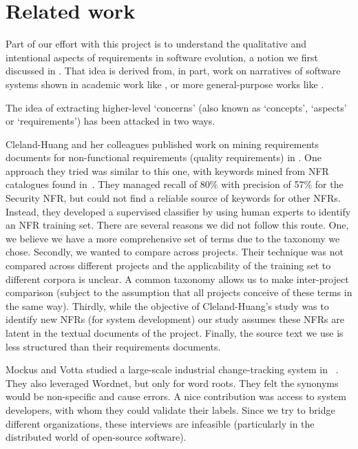 \documentclass{acm_proc_article-sp}
\begin{document}
\section{Related work}

Part of our effort with this project is to understand the qualitative and intentional aspects of requirements in software evolution, a notion we first discussed in \cite{ernst07icsm}. That idea is derived from, in part, work on narratives of software systems shown in academic work like \cite{anton01}, or more general-purpose works like \cite{waldo93}.

The idea of extracting higher-level `concerns' (also known as `concepts', `aspects' or `requirements') has been attacked in two ways.

Cleland-Huang and her colleagues published work on mining requirements documents for non-functional requirements (quality requirements) in \cite{Cleland-Huang2006}. One approach they tried was similar to this one, with keywords mined from NFR catalogues found in~\cite{chung99}. They managed recall of 80\% with precision of 57\% for the Security NFR, but could not find a reliable source of keywords for other NFRs. Instead, they developed a supervised classifier by using human experts to identify an NFR training set. There are several reasons we did not follow this route. One, we believe we have a more comprehensive set of terms due to the taxonomy we chose. Secondly, we wanted to compare across projects. Their technique was not compared across different projects and the applicability of the training set to different corpora is unclear. A common taxonomy allows us to make inter-project comparison (subject to the assumption that all projects conceive of these terms in the same way). Thirdly, while the objective of Cleland-Huang's study was to identify new NFRs (for system development) our study assumes these NFRs are latent in the textual documents of the project. Finally, the source text we use is less structured than their requirements documents.

Mockus and Votta studied a large-scale industrial change-tracking system in ~\cite{Mockus00}. They also leveraged Wordnet, but only for word roots. They felt the synonyms would be non-specific and cause errors. A nice contribution was access to system developers, with whom they could validate their labels. Since we try to bridge different organizations, these interviews are infeasible (particularly in the distributed world of open-source software).
\end{document}
